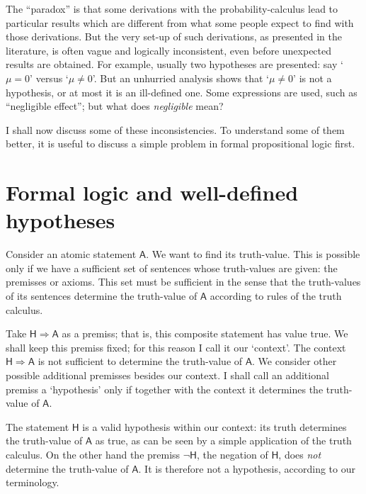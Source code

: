 \documentclass[\ifafour a4paper,12pt,\else a5paper,10pt,\fi%
onecolumn,oneside,article,%
british%
]{memoir}
\newcommand*{\defquote}[1]{`#1'}
\theoremstyle{remark}
\theoremstyle{innote}
\newcommand*{\limplies}{\mathbin{\Rightarrow}}%
\renewcommand*{\|}[1][]{\nonscript\,#1\vert\nonscript\;\mathopen{}}
\newcommand*{\yH}{\mathsf{H}}
\newcommand*{\yA}{\mathsf{A}}
\newcommand*{\true}{\textsf{true}}
\begin{document}
The \enquote{paradox} is that some derivations with the
probability-calculus lead to particular results which are different from
what some people expect to find with those derivations. But the very set-up
of such derivations, as presented in the literature, is often vague and
logically inconsistent, even before unexpected results are obtained. For
example, usually two hypotheses are presented: say \defquote{$\mu = 0$}
versus \defquote{$\mu \ne 0$}. But an unhurried analysis shows that
\defquote{$\mu \ne 0$} is not a hypothesis, or at most it is an
ill-defined one. Some expressions are used, such as \enquote{negligible
  effect}; but what does \emph{negligible} mean?%

I shall now discuss some of these inconsistencies. To understand some of
them better, it is useful to discuss a simple problem in formal
propositional logic first.


\section{Formal logic and well-defined hypotheses}
\label{sec:logic_welldefined}

Consider an atomic statement $\yA$. We want to find its truth-value. This
is possible only if we have a sufficient set of sentences whose
truth-values are given: the premisses or axioms. This set must be
sufficient in the sense that the truth-values of its sentences determine
the truth-value of $\yA$ according to rules of the truth calculus.

Take $\yH \limplies \yA$ as a premiss; that is, this composite statement
has value \true. We shall keep this premiss fixed; for this reason I call
it our \defquote{context}. The context $\yH \limplies \yA$ is not
sufficient to determine the truth-value of $\yA$. We consider other
possible additional premisses besides our context. I shall call an
additional premiss a \defquote{hypothesis} only if together with the
context it determines the truth-value of $\yA$.

The statement $\yH$ is a valid hypothesis within our context: its truth
determines the truth-value of $\yA$ as \true, as can be seen by a simple
application of the truth calculus. On the other hand the premiss
$\lnot\yH$, the negation of $\yH$, does \emph{not} determine the
truth-value of $\yA$. It is therefore not a hypothesis, according to our
terminology.
\end{document}
